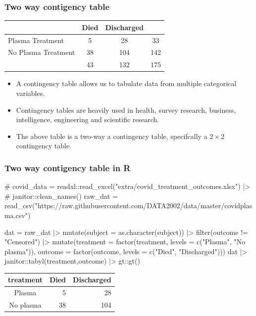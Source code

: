 \documentclass[a4paper]{article}
\begin{document}
\subsubsection{Two way contigency table}
\begin{table}[H]
	\centering
	\begin{tabular}{@{}lccc@{}}
	\toprule
						& Died & Discharged &     \\ \midrule
	Plasma Treatment    & 5    & 28         & 33  \\
	No Plasma Treatment & 38   & 104        & 142 \\ \midrule
						& 43   & 132        & 175 \\ \bottomrule
	\end{tabular}
\end{table}
\begin{itemize}
	\item A contingency table allows us to tabulate data from multiple categorical variables.
	\item Contingency tables are heavily used in health, survey research, business, intelligence, engineering and scientific research.
	\item The above table is a two-way a contingency table, specifcally a \( 2 \times 2 \) contingency table.
\end{itemize}
\subsubsection{Two way contigency table in R}
\begin{Schunk}
\begin{Sinput}
# covid_data = readxl::read_excel("extra/covid_treatment_outcomes.xlsx") |>
#   janitor::clean_names()
raw_dat = read_csv("https://raw.githubusercontent.com/DATA2002/data/master/covidplasma.csv")


dat = raw_dat |>
	  mutate(subject = as.character(subject)) |> 
	  filter(outcome != "Censored") |>
	  mutate(treatment = factor(treatment, levels = c("Plasma", "No plasma")),
	  outcome = factor(outcome, levels = c("Died", "Discharged"))) 
dat |>
  janitor::tabyl(treatment,outcome) |>
gt::gt()
\end{Sinput}
\begin{longtable}{crr}
\toprule
treatment & Died & Discharged \\ 
\midrule\addlinespace[2.5pt]
Plasma & 5 & 28 \\ 
No plasma & 38 & 104 \\ 
\bottomrule
\end{longtable}
\end{Schunk}
\end{document}
